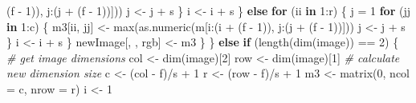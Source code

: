 \documentclass[
  12pt,
]{krantz}
\makeatletter
\newenvironment{Shaded}{\begin{snugshade}}{\end{snugshade}}
\newcommand{\AttributeTok}[1]{\textcolor[rgb]{0.61,0.61,0.61}{#1}}
\newcommand{\CommentTok}[1]{\textcolor[rgb]{0.37,0.37,0.37}{\textit{#1}}}
\newcommand{\ControlFlowTok}[1]{\textcolor[rgb]{0.27,0.27,0.27}{\textbf{#1}}}
\newcommand{\DecValTok}[1]{\textcolor[rgb]{0.06,0.06,0.06}{#1}}
\newcommand{\FunctionTok}[1]{\textcolor[rgb]{0,0,0}{#1}}
\newcommand{\NormalTok}[1]{#1}
\newcommand{\OtherTok}[1]{\textcolor[rgb]{0.37,0.37,0.37}{#1}}
\newcommand{\SpecialCharTok}[1]{\textcolor[rgb]{0,0,0}{#1}}
\newenvironment{kframe}{%
\medskip{}
\setlength{\fboxsep}{.8em}
 \def\at@end@of@kframe{}%
 \ifinner\ifhmode%
  \def\at@end@of@kframe{\end{minipage}}%
  \begin{minipage}{\columnwidth}%
 \fi\fi%
 \def\FrameCommand##1{\hskip\@totalleftmargin \hskip-\fboxsep
 \colorbox{shadecolor}{##1}\hskip-\fboxsep
     \hskip-\linewidth \hskip-\@totalleftmargin \hskip\columnwidth}%
 \MakeFramed {\advance\hsize-\width
   \@totalleftmargin\z@ \linewidth\hsize
   \@setminipage}}%
 {\par\unskip\endMakeFramed%
 \at@end@of@kframe}
\renewenvironment{Shaded}{\begin{kframe}}{\end{kframe}}
\makeatother
\begin{document}
\begin{Shaded}
\begin{Highlighting}[]
\NormalTok{                      (f }\SpecialCharTok{{-}} \DecValTok{1}\NormalTok{)), j}\SpecialCharTok{:}\NormalTok{(j }\SpecialCharTok{+}\NormalTok{ (f }\SpecialCharTok{{-}} \DecValTok{1}\NormalTok{))]))}
\NormalTok{                    j }\OtherTok{\textless{}{-}}\NormalTok{ j }\SpecialCharTok{+}\NormalTok{ s}
\NormalTok{                  \}}
\NormalTok{                  i }\OtherTok{\textless{}{-}}\NormalTok{ i }\SpecialCharTok{+}\NormalTok{ s}
\NormalTok{                \} }\ControlFlowTok{else} \ControlFlowTok{for}\NormalTok{ (ii }\ControlFlowTok{in} \DecValTok{1}\SpecialCharTok{:}\NormalTok{r) \{}
\NormalTok{                j }\OtherTok{=} \DecValTok{1}
                \ControlFlowTok{for}\NormalTok{ (jj }\ControlFlowTok{in} \DecValTok{1}\SpecialCharTok{:}\NormalTok{c) \{}
\NormalTok{                  m3[ii, jj] }\OtherTok{\textless{}{-}} \FunctionTok{max}\NormalTok{(}\FunctionTok{as.numeric}\NormalTok{(m[i}\SpecialCharTok{:}\NormalTok{(i }\SpecialCharTok{+} 
\NormalTok{                    (f }\SpecialCharTok{{-}} \DecValTok{1}\NormalTok{)), j}\SpecialCharTok{:}\NormalTok{(j }\SpecialCharTok{+}\NormalTok{ (f }\SpecialCharTok{{-}} \DecValTok{1}\NormalTok{))]))}
\NormalTok{                  j }\OtherTok{\textless{}{-}}\NormalTok{ j }\SpecialCharTok{+}\NormalTok{ s}
\NormalTok{                \}}
\NormalTok{                i }\OtherTok{\textless{}{-}}\NormalTok{ i }\SpecialCharTok{+}\NormalTok{ s}
\NormalTok{            \}}
\NormalTok{            newImage[, , rgb] }\OtherTok{\textless{}{-}}\NormalTok{ m3}
\NormalTok{        \}}
\NormalTok{    \} }\ControlFlowTok{else} \ControlFlowTok{if}\NormalTok{ (}\FunctionTok{length}\NormalTok{(}\FunctionTok{dim}\NormalTok{(image)) }\SpecialCharTok{==} \DecValTok{2}\NormalTok{) \{}
        \CommentTok{\# get image dimensions}
\NormalTok{        col }\OtherTok{\textless{}{-}} \FunctionTok{dim}\NormalTok{(image)[}\DecValTok{2}\NormalTok{]}
\NormalTok{        row }\OtherTok{\textless{}{-}} \FunctionTok{dim}\NormalTok{(image)[}\DecValTok{1}\NormalTok{]}
        \CommentTok{\# calculate new dimension size}
\NormalTok{        c }\OtherTok{\textless{}{-}}\NormalTok{ (col }\SpecialCharTok{{-}}\NormalTok{ f)}\SpecialCharTok{/}\NormalTok{s }\SpecialCharTok{+} \DecValTok{1}
\NormalTok{        r }\OtherTok{\textless{}{-}}\NormalTok{ (row }\SpecialCharTok{{-}}\NormalTok{ f)}\SpecialCharTok{/}\NormalTok{s }\SpecialCharTok{+} \DecValTok{1}
\NormalTok{        m3 }\OtherTok{\textless{}{-}} \FunctionTok{matrix}\NormalTok{(}\DecValTok{0}\NormalTok{, }\AttributeTok{ncol =}\NormalTok{ c, }\AttributeTok{nrow =}\NormalTok{ r)}
\NormalTok{        i }\OtherTok{\textless{}{-}} \DecValTok{1}

\end{Highlighting}
\end{Shaded}
\end{document}
